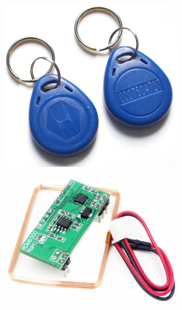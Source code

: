         \begin{figure} [!ht]
            \centering
            \caption{EM4100 RFID tag and RDM6300 RFID reader (taken from \cite{image:em4100}, \cite{image:rdm6300})}
    
            \begin{subfigure}[b]{0.45\textwidth}
                \includegraphics[width=\textwidth]{02.HW/Figs/em4100.jpg}
            \end{subfigure}
             \hfill
            \begin{subfigure}[b]{0.45\textwidth}
                 \centering
                 \includegraphics[width=\textwidth]{02.HW/Figs/rdm6300.jpg}
             \end{subfigure}
        \end{figure}     
             
